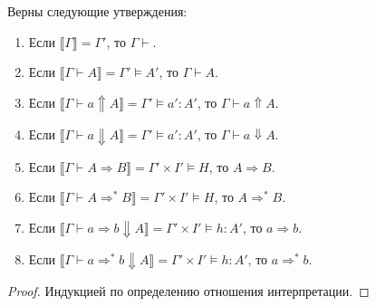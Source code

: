 \documentclass{amsart}
\theoremstyle{definition}
\theoremstyle{remark}
\newcommand{\red}{\Rightarrow}
\renewcommand{\ll}{\llbracket}
\newcommand{\rr}{\rrbracket}
\numberwithin{figure}{section}
\begin{document}
\begin{lem}
Верны следующие утверждения:
\begin{enumerate}
\item Если $\ll \Gamma \rr = \Gamma'$, то $\Gamma \vdash$.
\item Если $\ll \Gamma \vdash A \rr = \Gamma' \models A'$, то $\Gamma \vdash A$.
\item Если $\ll \Gamma \vdash a \Uparrow A \rr = \Gamma' \models a' : A'$, то $\Gamma \vdash a \Uparrow A$.
\item Если $\ll \Gamma \vdash a \Downarrow A \rr = \Gamma' \models a' : A'$, то $\Gamma \vdash a \Downarrow A$.
\item Если $\ll \Gamma \vdash A \red B \rr = \Gamma' \times I' \models H$, то $A \red B$.
\item Если $\ll \Gamma \vdash A \red^* B \rr = \Gamma' \times I' \models H$, то $A \red^* B$.
\item Если $\ll \Gamma \vdash a \red b \Downarrow A \rr = \Gamma' \times I' \models h : A'$, то $a \red b$.
\item Если $\ll \Gamma \vdash a \red^* b \Downarrow A \rr = \Gamma' \times I' \models h : A'$, то $a \red^* b$.
\end{enumerate}
\end{lem}
\begin{proof}
Индукцией по определению отношения интерпретации.
\end{proof}
\end{document}
